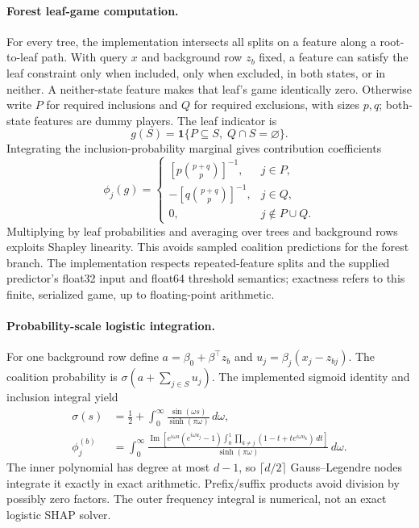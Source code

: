 \documentclass{article}
\begin{document}
\paragraph{Forest leaf-game computation.}
For every tree, the implementation intersects all splits on a feature along a root-to-leaf path. With query $x$ and background row $z_b$ fixed, a feature can satisfy the leaf constraint only when included, only when excluded, in both states, or in neither. A neither-state feature makes that leaf's game identically zero. Otherwise write $P$ for required inclusions and $Q$ for required exclusions, with sizes $p,q$; both-state features are dummy players. The leaf indicator is
\begin{equation}
 g(S)=\mathbf{1}\{P\subseteq S,\;Q\cap S=\varnothing\}.
\end{equation}
Integrating the inclusion-probability marginal gives contribution coefficients
\begin{equation}
 \phi_j(g)=\begin{cases}
   [p\binom{p+q}{p}]^{-1},&j\in P,\\
   -[q\binom{p+q}{p}]^{-1},&j\in Q,\\
   0,&j\notin P\cup Q.
 \end{cases} \label{eq:leaf}
\end{equation}
Multiplying by leaf probabilities and averaging over trees and background rows exploits Shapley linearity. This avoids sampled coalition predictions for the forest branch. The implementation respects repeated-feature splits and the supplied predictor's float32 input and float64 threshold semantics; exactness refers to this finite, serialized game, up to floating-point arithmetic.

\paragraph{Probability-scale logistic integration.}
For one background row define $a=\beta_0+\beta^\top z_b$ and $u_j=\beta_j(x_j-z_{bj})$. The coalition probability is $\sigma(a+\sum_{j\in S}u_j)$. The implemented sigmoid identity and inclusion integral yield
\begin{align}
 \sigma(s)&=\tfrac12+\int_0^\infty\frac{\sin(\omega s)}{\sinh(\pi\omega)}\,d\omega,\\
 \phi_j^{(b)}&=\int_0^\infty\!\frac{\operatorname{Im}\!\left[e^{i\omega a}(e^{i\omega u_j}-1)
 \int_0^1\prod_{k\ne j}(1-t+t e^{i\omega u_k})\,dt\right]}
 {\sinh(\pi\omega)}\,d\omega. \label{eq:logistic}
\end{align}
The inner polynomial has degree at most $d-1$, so $\lceil d/2\rceil$ Gauss--Legendre nodes integrate it exactly in exact arithmetic. Prefix/suffix products avoid division by possibly zero factors. The outer frequency integral is numerical, not an exact logistic SHAP solver.
\end{document}
